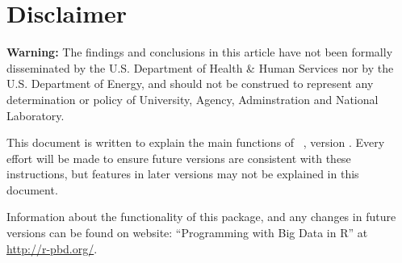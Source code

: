 \chapter*{Disclaimer}

{\color{red} \bf Warning:}
The findings and conclusions in this article have not been
formally disseminated by the U.S. Department of Health \& Human Services
nor by the U.S. Department of Energy,
and should not be construed to represent any determination or
policy of University, Agency, Adminstration and National Laboratory.

This document is written to explain the main
functions of ~\citep{Schmidt2013pbdDEMOpackage}, version \demoversion.
Every effort will be made to ensure future versions are consistent with
these instructions, but features in later versions may not be explained
in this document.

Information about the functionality of this package,
and any changes in future versions can be found on website:
``Programming with Big Data in R'' at
\url{http://r-pbd.org/}.

